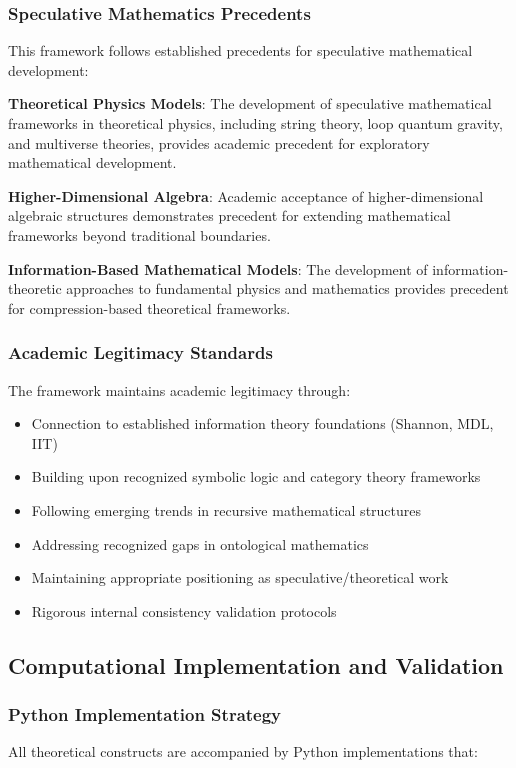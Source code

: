 \subsubsection{Speculative Mathematics Precedents}
This framework follows established precedents for speculative mathematical development:

\textbf{Theoretical Physics Models}: The development of speculative mathematical frameworks in theoretical physics, including string theory, loop quantum gravity, and multiverse theories, provides academic precedent for exploratory mathematical development.

\textbf{Higher-Dimensional Algebra}: Academic acceptance of higher-dimensional algebraic structures demonstrates precedent for extending mathematical frameworks beyond traditional boundaries.

\textbf{Information-Based Mathematical Models}: The development of information-theoretic approaches to fundamental physics and mathematics provides precedent for compression-based theoretical frameworks.

\subsubsection{Academic Legitimacy Standards}
The framework maintains academic legitimacy through:

\begin{itemize}
\item Connection to established information theory foundations (Shannon, MDL, IIT)
\item Building upon recognized symbolic logic and category theory frameworks
\item Following emerging trends in recursive mathematical structures
\item Addressing recognized gaps in ontological mathematics
\item Maintaining appropriate positioning as speculative/theoretical work
\item Rigorous internal consistency validation protocols
\end{itemize}

\subsection{Computational Implementation and Validation}

\subsubsection{Python Implementation Strategy}
All theoretical constructs are accompanied by Python implementations that:

